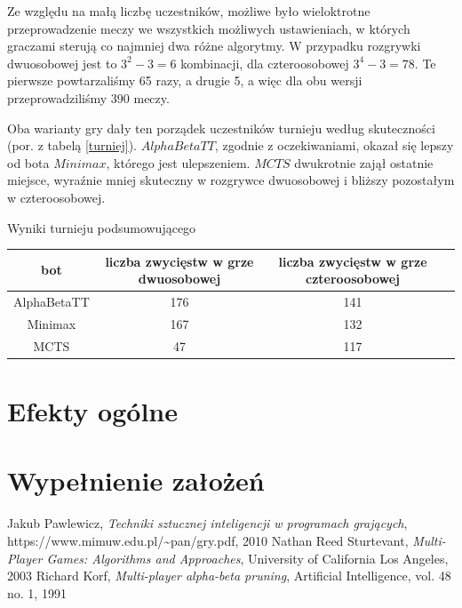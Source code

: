 \documentclass{pracamgr}
\begin{document}
Ze względu na małą liczbę uczestników, możliwe było wieloktrotne przeprowadzenie meczy we wszystkich możliwych ustawieniach, w których graczami sterują co najmniej dwa różne algorytmy.
W przypadku rozgrywki dwuosobowej jest to \(3^2 - 3 = 6\) kombinacji, dla czteroosobowej \(3^4 - 3 = 78\).
Te pierwsze powtarzaliśmy 65 razy, a drugie 5, a więc dla obu wersji przeprowadziliśmy 390 meczy.

Oba warianty gry dały ten porządek uczestników turnieju według skuteczności (por. z tabelą \ref{turniej}).
\(AlphaBetaTT\), zgodnie z oczekiwaniami, okazał się lepszy od bota \(Minimax\), którego jest ulepszeniem.
\(MCTS\) dwukrotnie zajął ostatnie miejsce, wyraźnie mniej skuteczny w rozgrywce dwuosobowej i bliższy pozostałym w czteroosobowej.

\begin{tabela}
    \caption{Wyniki turnieju podsumowującego \label{turniej}}
    \begin{tabular}{| c | c | c | c |}
	\hline
        bot & liczba zwycięstw w grze dwuosobowej & liczba zwycięstw w grze czteroosobowej \\ \hline
	\hline
        AlphaBetaTT & 176 & 141 \\ \hline
        Minimax & 167 & 132 \\ \hline
        MCTS & 47 & 117 \\ \hline
    \end{tabular}
\end{tabela}

\section{Efekty ogólne}

\section{Wypełnienie założeń}

\begin{thebibliography}{98}

 Jakub Pawlewicz, \textit{Techniki sztucznej inteligencji
    w programach grających}, https://www.mimuw.edu.pl/\textasciitilde{}pan/gry.pdf, 2010
 Nathan Reed Sturtevant, \textit{Multi-Player Games: Algorithms and Approaches}, University of California Los Angeles, 2003
 Richard Korf, \textit{Multi-player alpha-beta pruning}, Artificial Intelligence, vol. 48 no. 1, 1991

\end{thebibliography}
\end{document}
